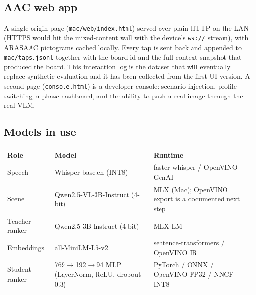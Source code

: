 \documentclass[11pt]{article}
\newcommand{\code}[1]{\texttt{#1}}
\newcommand{\file}[1]{\texttt{\small #1}}
\begin{document}
\subsection{AAC web app}
A single-origin page (\file{mac/web/index.html}) served over plain HTTP on the
LAN (HTTPS would hit the mixed-content wall with the device's \code{ws://}
stream), with ARASAAC pictograms cached locally. Every tap is sent back and
appended to \file{mac/taps.jsonl} together with the board id and the full
context snapshot that produced the board. This interaction log is the dataset
that will eventually replace synthetic evaluation and it has been collected
from the first UI version. A second page (\file{console.html}) is a developer
console: scenario injection, profile switching, a phase dashboard, and the
ability to push a real image through the real VLM.

\subsection{Models in use}
\begin{center}
\begin{tabular}{@{}lll@{}}
\toprule
\textbf{Role} & \textbf{Model} & \textbf{Runtime} \\ \midrule
Speech & Whisper base.en (INT8) & faster-whisper / OpenVINO GenAI \\
Scene & Qwen2.5-VL-3B-Instruct (4-bit) & MLX (Mac); OpenVINO export is a documented next step \\
Teacher ranker & Qwen2.5-3B-Instruct (4-bit) & MLX-LM \\
Embeddings & all-MiniLM-L6-v2 & sentence-transformers / OpenVINO IR \\
Student ranker & 769$\to$192$\to$94 MLP (LayerNorm, ReLU, dropout 0.3) & PyTorch / ONNX / OpenVINO FP32 / NNCF INT8 \\
\bottomrule
\end{tabular}
\end{center}

\end{document}
